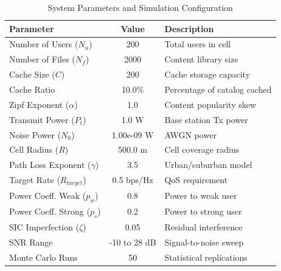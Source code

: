 \documentclass{article}
\begin{document}
\begin{table}[h]
\centering
\caption{System Parameters and Simulation Configuration}
\label{tab:system_params}
\begin{tabular}{|l|c|l|}
\hline
\textbf{Parameter} & \textbf{Value} & \textbf{Description} \\
\hline
Number of Users ($N_u$) & 200 & Total users in cell \\
Number of Files ($N_f$) & 2000 & Content library size \\
Cache Size ($C$) & 200 & Cache storage capacity \\
Cache Ratio & 10.0\% & Percentage of catalog cached \\
Zipf Exponent ($\alpha$) & 1.0 & Content popularity skew \\
\hline
Transmit Power ($P_t$) & 1.0 W & Base station Tx power \\
Noise Power ($N_0$) & 1.00e-09 W & AWGN power \\
Cell Radius ($R$) & 500.0 m & Cell coverage radius \\
Path Loss Exponent ($\gamma$) & 3.5 & Urban/suburban model \\
\hline
Target Rate ($R_{target}$) & 0.5 bps/Hz & QoS requirement \\
Power Coeff. Weak ($p_w$) & 0.8 & Power to weak user \\
Power Coeff. Strong ($p_s$) & 0.2 & Power to strong user \\
SIC Imperfection ($\zeta$) & 0.05 & Residual interference \\
\hline
SNR Range & -10 to 28 dB & Signal-to-noise sweep \\
Monte Carlo Runs & 50 & Statistical replications \\
\hline
\end{tabular}
\end{table}


\newpage
\end{document}
